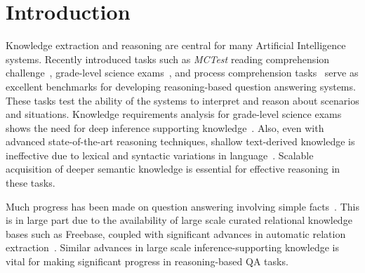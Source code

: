 \section{Introduction}

Knowledge extraction and reasoning are central for many Artificial Intelligence systems. 
Recently introduced tasks such as {\em MCTest} reading comprehension challenge~\cite{richardson2013mctest}, grade-level science exams~\cite{clark2015elementary}, and process comprehension tasks~\cite{berantSrikumar14} serve as excellent benchmarks for developing reasoning-based question answering systems. 
These tasks test the ability of the systems to interpret and reason about scenarios and situations.
Knowledge requirements analysis for grade-level science exams shows the need for deep inference supporting knowledge~\cite{chb2013:akbc,clark2014:akbc}.
Also, even with advanced state-of-the-art reasoning techniques, shallow text-derived knowledge is ineffective due to lexical and syntactic variations in language~\cite{khot2015:emlnlp}.
Scalable acquisition of deeper semantic knowledge is essential for effective reasoning in these tasks. 

Much progress has been made on question answering involving simple facts~\cite{berant2013semantic,fader2014open,bordes2014open,reddy2014large}. 
This is in large part due to the availability of large scale curated relational knowledge bases such as Freebase, coupled with significant advances in automatic relation extraction~\cite{schmitz2012open,carlson2010toward,suchanek2007yago}. 
Similar advances in large scale inference-supporting knowledge is vital for making significant progress in reasoning-based QA tasks.


